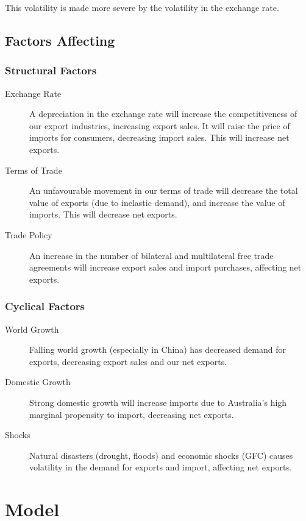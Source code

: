 \documentclass[a4paper,11pt]{report}
\begin{document}
This volatility is made more severe by the volatility in the exchange rate.

\subsection{Factors Affecting}

\subsubsection{Structural Factors}

\begin{description}
\item [Exchange Rate] A depreciation in the exchange rate will increase the
	competitiveness of our export industries, increasing export sales. It will
	raise the price of imports for consumers, decreasing import sales. This
	will increase net exports.
\item [Terms of Trade] An unfavourable movement in our terms of trade will
	decrease the total value of exports (due to inelastic demand), and increase
	the value of imports. This will decrease net exports.
\item [Trade Policy] An increase in the number of bilateral and multilateral
	free trade agreements will increase export sales and import purchases,
	affecting net exports.
\end{description}

\subsubsection{Cyclical Factors}

\begin{description}
\item [World Growth] Falling world growth (especially in China) has decreased
	demand for exports, decreasing export sales and our net exports.
\item [Domestic Growth] Strong domestic growth will increase imports due to
	Australia's high marginal propensity to import, decreasing net exports.
\item [Shocks] Natural disasters (drought, floods) and economic shocks (GFC)
	causes volatility in the demand for exports and import, affecting net
	exports.
\end{description}


\section{Model}
\end{document}
